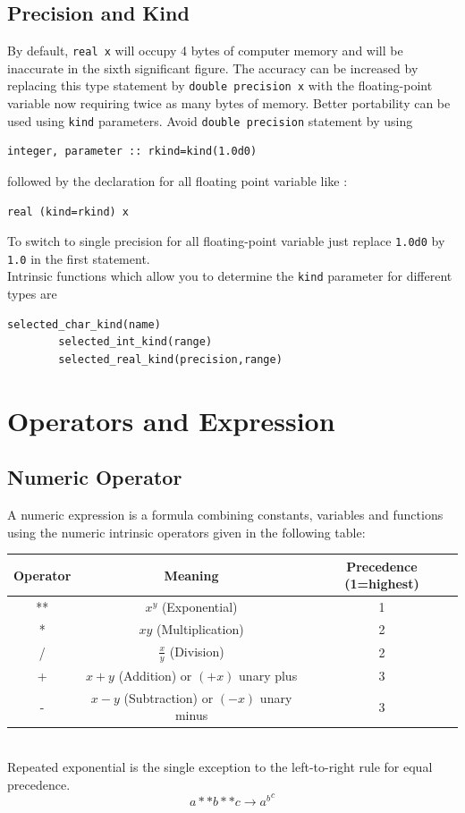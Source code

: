 \documentclass[12pt,oneside]{book}
\newcommand{\code}[1]{\lstinline[keywordstyle=\color{black},basicstyle=\ttfamily]{#1}}
\begin{document}
    \subsection{Precision and Kind}
    By default, \code{real x} will occupy 4 bytes of computer memory and will be inaccurate in the sixth significant figure. 
    The accuracy can be increased by replacing this type statement by \code{double precision x} with the floating-point variable now requiring twice as many bytes of memory. Better portability can be used using \code{kind} parameters. Avoid \code{double precision} statement by using 
    \begin{lstlisting}[numbers=none]
        integer, parameter :: rkind=kind(1.0d0)
    \end{lstlisting}
    followed by the declaration for all floating point variable like :
    \begin{lstlisting}[numbers=none]
        real (kind=rkind) x
    \end{lstlisting}
    To switch to single precision for all floating-point variable just replace \code{1.0d0} by \code{1.0} in the first statement.\\

    Intrinsic functions which allow you to determine the \code{kind} parameter for different types are
    \begin{lstlisting}[numbers=none]
        selected_char_kind(name)
        selected_int_kind(range)
        selected_real_kind(precision,range)
    \end{lstlisting}
    \section{Operators and Expression}
    \subsection{Numeric Operator}
    A numeric expression is a formula combining constants, variables and functions using the numeric intrinsic operators given in the following table:
    \begin{table}[h!]
        \centering
        \begin{tabular}{|c|c|c|}
            \hline
            Operator & Meaning & Precedence (1=highest)\\\hline
            ** & $ x^y $ (Exponential) & 1\\\hline
            * & $ xy  $ (Multiplication)& 2\\\hline
            / & $ \frac{\displaystyle x}{\displaystyle y}  $ (Division)& 2\\\hline
            + & $ x+y  $ (Addition) or $ (+x) $ unary plus & 3\\\hline
            - & $ x-y  $ (Subtraction) or $ (-x) $ unary minus & 3\\\hline
        \end{tabular}
    \end{table}
    \\Repeated exponential is the single exception to the left-to-right rule for equal precedence.
    \[a**b**c\to {a^b}^c\]
\end{document}
